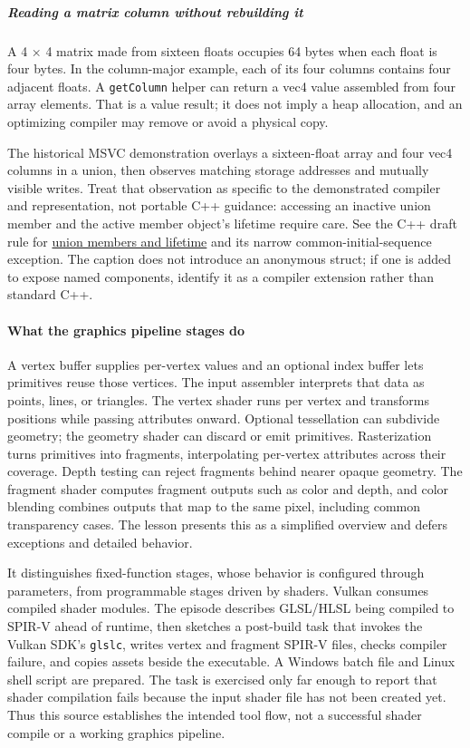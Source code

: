 \subparagraph{Reading a matrix column without rebuilding it}\label{reading-a-matrix-column-without-rebuilding-it}

A 4 × 4 matrix made from sixteen floats occupies 64 bytes when each float is four bytes. In the column-major example, each of its four columns contains four adjacent floats. A \texttt{getColumn} helper can return a vec4 value assembled from four array elements. That is a value result; it does not imply a heap allocation, and an optimizing compiler may remove or avoid a physical copy.

The historical MSVC demonstration overlays a sixteen-float array and four vec4 columns in a union, then observes matching storage addresses and mutually visible writes. Treat that observation as specific to the demonstrated compiler and representation, not portable C++ guidance: accessing an inactive union member and the active member object's lifetime require care. See the C++ draft rule for \href{https://eel.is/c++draft/class.union}{union members and lifetime} and its narrow common-initial-sequence exception. The caption does not introduce an anonymous struct; if one is added to expose named components, identify it as a compiler extension rather than standard C++.

\paragraph{What the graphics pipeline stages do}\label{what-the-graphics-pipeline-stages-do}

A vertex buffer supplies per-vertex values and an optional index buffer lets primitives reuse those vertices. The input assembler interprets that data as points, lines, or triangles. The vertex shader runs per vertex and transforms positions while passing attributes onward. Optional tessellation can subdivide geometry; the geometry shader can discard or emit primitives. Rasterization turns primitives into fragments, interpolating per-vertex attributes across their coverage. Depth testing can reject fragments behind nearer opaque geometry. The fragment shader computes fragment outputs such as color and depth, and color blending combines outputs that map to the same pixel, including common transparency cases. The lesson presents this as a simplified overview and defers exceptions and detailed behavior.

It distinguishes fixed-function stages, whose behavior is configured through parameters, from programmable stages driven by shaders. Vulkan consumes compiled shader modules. The episode describes GLSL/HLSL being compiled to SPIR-V ahead of runtime, then sketches a post-build task that invokes the Vulkan SDK's \texttt{glslc}, writes vertex and fragment SPIR-V files, checks compiler failure, and copies assets beside the executable. A Windows batch file and Linux shell script are prepared. The task is exercised only far enough to report that shader compilation fails because the input shader file has not been created yet. Thus this source establishes the intended tool flow, not a successful shader compile or a working graphics pipeline.

